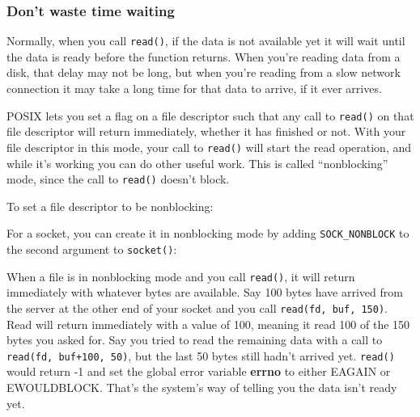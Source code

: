 \subsubsection{Don't waste time waiting}\label{dont-waste-time-waiting}

Normally, when you call \texttt{read()}, if the data is not available
yet it will wait until the data is ready before the function returns.
When you're reading data from a disk, that delay may not be long, but
when you're reading from a slow network connection it may take a long
time for that data to arrive, if it ever arrives.

POSIX lets you set a flag on a file descriptor such that any call to
\texttt{read()} on that file descriptor will return immediately, whether
it has finished or not. With your file descriptor in this mode, your
call to \texttt{read()} will start the read operation, and while it's
working you can do other useful work. This is called ``nonblocking''
mode, since the call to \texttt{read()} doesn't block.

To set a file descriptor to be nonblocking:

\begin{Shaded}
\begin{Highlighting}[]
     \NormalTok{);}
\end{Highlighting}
\end{Shaded}

For a socket, you can create it in nonblocking mode by adding
\texttt{SOCK\_NONBLOCK} to the second argument to \texttt{socket()}:

\begin{Shaded}
\begin{Highlighting}[]
    \NormalTok{);}
\end{Highlighting}
\end{Shaded}

When a file is in nonblocking mode and you call \texttt{read()}, it will
return immediately with whatever bytes are available. Say 100 bytes have
arrived from the server at the other end of your socket and you call
\texttt{read(fd,\ buf,\ 150)}. Read will return immediately with a value
of 100, meaning it read 100 of the 150 bytes you asked for. Say you
tried to read the remaining data with a call to
\texttt{read(fd,\ buf+100,\ 50)}, but the last 50 bytes still hadn't
arrived yet. \texttt{read()} would return -1 and set the global error
variable \textbf{errno} to either EAGAIN or EWOULDBLOCK. That's the
system's way of telling you the data isn't ready yet.

